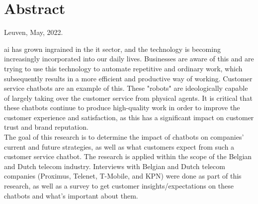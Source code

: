 \chapter*{Abstract\hfill} 
\label{ch:abstract}
\begin{flushright}
	Leuven, May, 2022.
\end{flushright}
\acrfull{ai} has grown ingrained in the \acrshort{it} sector, and the technology is becoming increasingly incorporated into our daily lives. Businesses are aware of this and are trying to use this technology to automate repetitive and ordinary work, which subsequently results in a more efficient and productive way of working. Customer service chatbots are an example of this. These "robots" are ideologically capable of largely taking over the customer service from physical agents. It is critical that these chatbots continue to produce high-quality work in order to improve the customer experience and satisfaction, as this has a significant impact on customer trust and brand reputation.\\
\break
The goal of this research is to determine the impact of chatbots on companies' current and future strategies, as well as what customers expect from such a customer service chatbot. The research is applied within the scope of the Belgian and Dutch telecom industry. Interviews with Belgian and Dutch telecom companies (Proximus, Telenet, T-Mobile, and KPN) were done as part of this research, as well as a survey to get customer insights/expectations on these chatbots and what's important about them.

